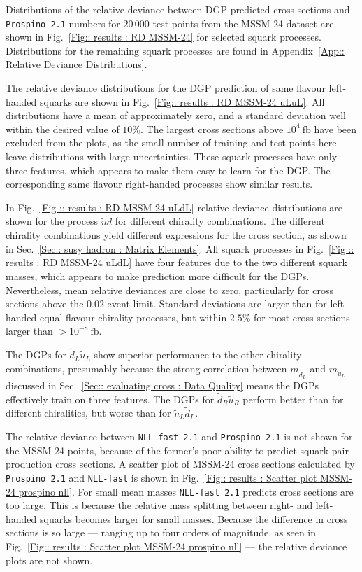 \documentclass[twoside,english]{uiofysmaster}
\begin{document}
{{Distributions of the relative deviance between DGP predicted cross sections and \verb|Prospino 2.1| numbers for $20\,000$ test points from the MSSM-24 dataset are shown in Fig.~\ref{Fig:: results : RD MSSM-24} for selected squark processes. Distributions for the remaining squark processes are found in Appendix~\ref{App:: Relative Deviance Distributions}.

The relative deviance distributions for the DGP prediction of same flavour left-handed squarks are shown in Fig.~\ref{Fig:: results : RD MSSM-24 uLuL}. All distributions have a mean of approximately zero, and a standard deviation well within the desired value of $10 \%$. The largest cross sections above $10^4~\mathrm{fb}$ have been excluded from the plots, as the small number of training and test points here leave distributions with large uncertainties. These squark processes have only three features, which appears to make them easy to learn for the DGP. The corresponding same flavour right-handed processes show similar results.

In Fig.~\ref{Fig :: results : RD MSSM-24 uLdL}  relative deviance distributions are shown for the process $\widetilde{u} \widetilde{d}$ for different chirality combinations. The different chirality combinations yield different expressions for the cross section, as shown in Sec.~\ref{Sec:: susy hadron : Matrix Elements}. All squark processes in Fig.~\ref{Fig :: results : RD MSSM-24 uLdL} have four features due to the two different squark masses, which appears to make prediction more difficult for the DGPs. Nevertheless, mean relative deviances are close to zero, particularly for cross sections above the $0.02$ event limit. Standard deviations are larger than for left-handed equal-flavour chirality processes, but within $2.5\%$ for most cross sections larger than $> 10^{-8}~\mathrm{fb}$.



The DGPs for $\widetilde{d}_L \widetilde{u}_L$ show superior performance to the other chirality combinations, presumably because the strong correlation between $m_{\widetilde{d}_L}$ and $m_{\widetilde{u}_L}$ discussed in Sec.~\ref{Sec:: evaluating cross : Data Quality} means the DGPs effectively train on three features. The DGPs for $\widetilde{d}_R \widetilde{u}_R$ perform better than for different chiralities, but worse than for $\widetilde{u}_L\widetilde{d}_L$.

The relative deviance between \verb|NLL-fast 2.1| and \verb|Prospino 2.1| is not shown for the MSSM-24 points, because of the former's poor ability to predict squark pair production cross sections. A scatter plot of MSSM-24 cross sections calculated by \verb|Prospino 2.1| and \verb|NLL-fast| is shown in Fig.~\ref{Fig:: results : Scatter plot MSSM-24 prospino nll}. For small mean masses \verb|NLL-fast 2.1| predicts cross sections are too large. This is because the relative mass splitting between right- and left-handed squarks becomes larger for small masses. Because the difference in cross sections is so large --- ranging up to four orders of magnitude, as seen in Fig.~\ref{Fig:: results : Scatter plot MSSM-24 prospino nll} --- the relative deviance plots are not shown.

}}
\end{document}
